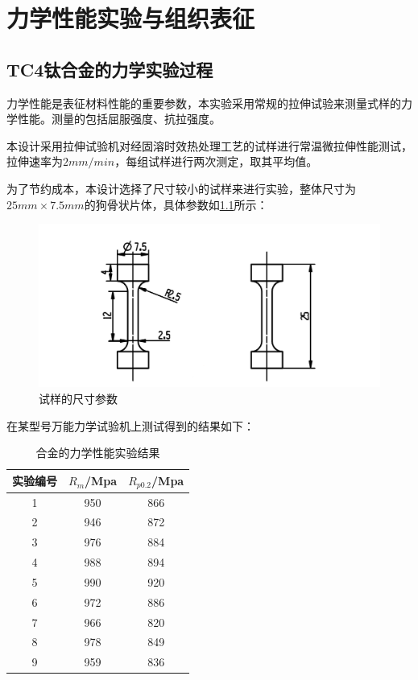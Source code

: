\chapter{力学性能实验与组织表征}

\section{TC4钛合金的力学实验过程}
力学性能是表征材料性能的重要参数，本实验采用常规的拉伸试验来测量式样的力学性能。测量的包括屈服强度、抗拉强度。

本设计采用拉伸试验机对经固溶时效热处理工艺的试样进行常温微拉伸性能测试，拉伸速率为$ 2mm/min $，每组试样进行两次测定，取其平均值。

为了节约成本，本设计选择了尺寸较小的试样来进行实验，整体尺寸为$ 25mm\times 7.5mm $的狗骨状片体，具体参数如\ref{fig:试样尺寸}所示：

\begin{figure}[h!]
	\centering
	\includegraphics[width=0.99\linewidth]{pic/试样}
	\caption{试样的尺寸参数}
	\label{fig:试样尺寸}
\end{figure}


在某型号万能力学试验机上测试得到的结果如下：

\begin{table}[htbp]
	\centering
	\caption{\ti 合金的力学性能实验结果}
	\label{sec:mystrength}
		\begin{tabular}{ccc}
			\toprule
			实验编号&$ R_m $/Mpa&$ R_{p0.2} $/Mpa \\
			\midrule
			1 & 950 & 866\\
			2 & 946 & 872\\
			3 & 976 & 884\\
			4 & 988 & 894\\
			5 & 990 & 920\\
			6 & 972 & 886\\
			7 & 966 & 820\\
			8 & 978 & 849\\
			9 & 959 & 836\\
			\bottomrule
		\end{tabular}
\end{table}
\newpage
